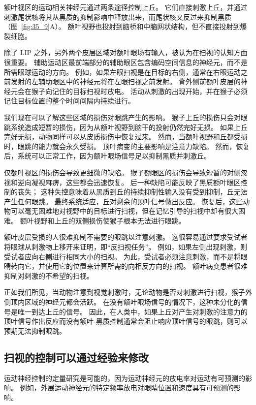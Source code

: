 额叶视区的运动相关神经元通过两条途径控制上丘。
它们直接刺激上丘，并通过刺激尾状核将其从黑质的抑制影响中释放出来，而尾状核又反过来抑制黑质（图~\ref{fig:35_9}A）。
额叶视野也投射到脑桥和中脑网状结构，但不直接投射到爆裂细胞。


除了 LIP 之外，另外两个皮层区域对额叶眼场有输入，被认为在扫视的认知方面很重要。
辅助运动区最前端部分的辅助眼区包含编码空间信息的神经元，而不是所需眼球运动的方向。
例如，如果左眼扫视是在目标的右侧，通常在右眼运动之前发射的左辅助眼区中的神经元将在左眼扫视之前发射。 背外侧前额叶皮层的神经元会在猴子向记住的目标扫视时放电。
活动从刺激的出现开始，并在猴子必须记住目标位置的整个时间间隔内持续进行。


我们现在可以了解这些区域的损伤对眼跳产生的影响。
猴子上丘的损伤只会对眼跳系统造成短暂的损伤，因为从额叶视野到脑干的投射仍然完好无损。
如果上丘完好无损，动物同样可以从皮质损伤中恢复过来。
然而，当额叶视野和丘都受损时，眼跳的能力就会永久受损。
顶叶病变的主要影响是注意力缺陷。
然而，恢复后，系统可以正常工作，因为额叶眼场信号足以抑制黑质并刺激丘。


仅额叶视区的损伤会导致更细微的缺陷。
猴子额眼区的损伤会导致短暂的对侧忽视和逆向凝视麻痹，这些都会迅速恢复。
后一种缺陷可能反映了黑质额叶眼区控制的丧失；
这种失控意味着从黑质到丘的持续抑制性输入没有受到抑制，丘无法产生任何眼跳。
最终系统适应，丘对剩余的顶叶信号做出反应。
恢复后，这些动物可以毫无困难地对视野中的目标进行扫视，但在记忆引导的扫视中却有很大困难。
额叶视野和上丘的双侧损伤使猴子根本无法进行眼跳。


额叶皮层受损的人很难抑制不需要的眼跳以注意刺激。
这很容易通过要求受试者将眼球从刺激物上移开来证明，即“反扫视任务”。
例如，如果左侧出现刺激，则受试者应向右侧进行相同大小的扫视。
为此，受试者必须注意刺激，而不是将眼睛转向它，并使用它的位置来计算所需的向相反方向的扫视。
额叶病变患者很难抑制对刺激的不希望的扫视。


正如我们所见，当动物注意到视觉刺激时，无论动物是否对刺激进行扫视，猴子外侧顶内区域的神经元都会活跃。
在没有额叶眼场信号的情况下，这种未分化的信号是唯一到达上丘的信号。
因此，在人类中，如果上丘对产生对刺激的注意力的顶叶信号作出反应而没有额叶-黑质控制通常会阻止响应顶叶信号的眼跳，则可以预期无法抑制眼跳。



\subsection{扫视的控制可以通过经验来修改}

运动神经控制的定量研究是可能的，因为运动神经元的放电率对运动有可预测的影响。
例如，外展运动神经元的特定频率放电对眼睛位置和速度具有可预测的影响。


